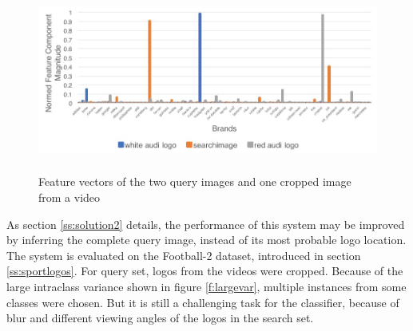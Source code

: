 \begin{figure}
  \centering
  \includegraphics[height=60mm]{images/mt/faster_confusion.jpg}
  \caption{Feature vectors of the two query images and one cropped image from a video}
  \label{f:fasterconfusion}
\end{figure}

As section \ref{ss:solution2} details, the performance of this system may be improved by inferring the complete query image, instead of its most probable logo location. The system is evaluated on the Football-2 dataset, introduced in section \ref{ss:sportlogos}. For query set, logos from the videos were cropped. Because of the large intraclass variance shown in figure \ref{f:largevar}, multiple instances from some classes were chosen. But it is still a challenging task for the classifier, because of blur and different viewing angles of the logos in the search set.

